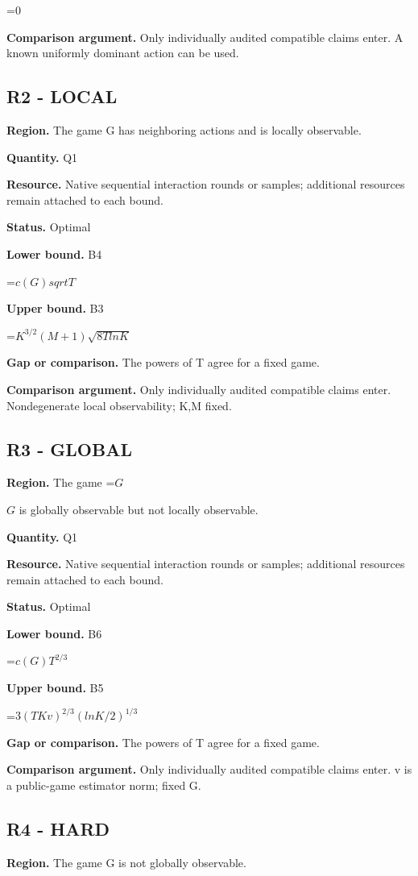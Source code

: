 \documentclass[10pt,a4paper]{article}
\newcommand{\AtlasMath}[1]{\par\begingroup\centering\setbox0=\hbox{$\displaystyle #1$}\ifdim\wd0>1.4\linewidth\typeout{ATLAS WIDE FORMULA: \the\wd0}\fi\ifdim\wd0>\linewidth\resizebox{\linewidth}{!}{\box0}\else\box0\fi\par\endgroup}
\newcommand{\AtlasInlineMath}[1]{\begingroup\setbox0=\hbox{$#1$}\ifdim\wd0>.4\linewidth\endgroup\AtlasMath{#1}\else\endgroup$#1$\fi}
\begin{document}
\AtlasMath{0}
\textbf{Comparison argument.} Only individually audited compatible claims enter. A known uniformly dominant action can be used.

\subsection{R2 - LOCAL}
\textbf{Region.} The game G has neighboring actions and is locally observable.

\textbf{Quantity.} Q1

\textbf{Resource.} Native sequential interaction rounds or samples; additional resources remain attached to each bound.

\textbf{Status.} Optimal

\textbf{Lower bound.} B4

\AtlasMath{c(G)sqrtT}
\textbf{Upper bound.} B3

\AtlasMath{K^{3/2}(M+1)\sqrt{8T lnK}}
\textbf{Gap or comparison.} The powers of T agree for a fixed game.

\textbf{Comparison argument.} Only individually audited compatible claims enter. Nondegenerate local observability; K,M fixed.

\subsection{R3 - GLOBAL}
\textbf{Region.} The game \AtlasInlineMath{G} is globally observable but not locally observable.

\textbf{Quantity.} Q1

\textbf{Resource.} Native sequential interaction rounds or samples; additional resources remain attached to each bound.

\textbf{Status.} Optimal

\textbf{Lower bound.} B6

\AtlasMath{c(G)T^{2/3}}
\textbf{Upper bound.} B5

\AtlasMath{3(TKv)^{2/3}(lnK/2)^{1/3}}
\textbf{Gap or comparison.} The powers of T agree for a fixed game.

\textbf{Comparison argument.} Only individually audited compatible claims enter. v is a public-game estimator norm; fixed G.

\subsection{R4 - HARD}
\textbf{Region.} The game G is not globally observable.
\end{document}

